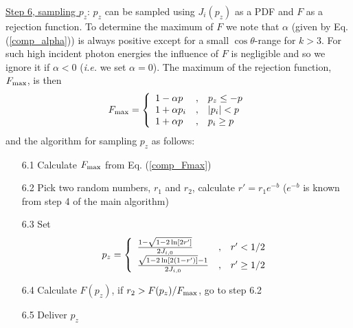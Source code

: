 \underline{Step 6, sampling $p_z$}:
$p_z$ can be sampled using $J_i(p_z)$ as a PDF and $F$ as a rejection
function. To determine the maximum of $F$ we note that $\alpha$
(given by Eq. (\ref{comp_alpha})) is always positive except for
a small $\cos \theta$-range for $k > 3$. For such high incident
photon energies the influence of $F$ is negligible and so
we ignore it if $\alpha < 0$ ({\em i.e.} we set $\alpha = 0$).
The maximum of the rejection function, $F_{\rm max}$, is then
\begin{equation}
F_{\rm max} =
\label{comp_Fmax}
 \left\{
\begin{array}{l@{\quad , \quad}l}
1 - \alpha p & p_z \le -p \\
1 + \alpha p_i & |p_i| < p \\
1 + \alpha p & p_i \ge p
\end{array} \right.
\end{equation}
and the algorithm for sampling $p_z$ as follows:
\begin{itemize}
\item[6.1]
Calculate $F_{\rm max}$ from Eq. (\ref{comp_Fmax})
\item[6.2]
Pick two random numbers, $r_1$ and $r_2$, calculate $r' = r_1 e^{-b}$
($e^{-b}$ is known from step 4 of the main algorithm)
\item[6.3]
Set
\begin{equation}
p_z = \left\{ \begin{array}{l@{\quad , \quad}l}
{1 - \sqrt{1 - 2 \ln [2 r']} \over 2 J_{i,0}} & r' < 1/2 \\
{\sqrt{1 - 2 \ln [2(1-r')]} - 1 \over 2 J_{i,0}} & r' \ge 1/2
\end{array} \right.
\end{equation}
\item[6.4]
Calculate $F(p_z)$, if $r_2 > F(p_z)/F_{\rm max}$, go to step 6.2
\item[6.5]
Deliver $p_z$
\end{itemize}

